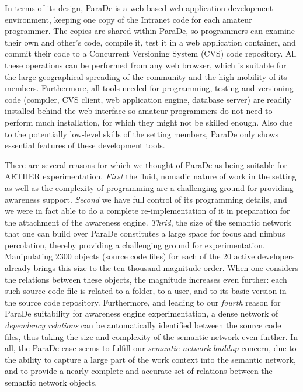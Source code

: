\documentclass{ecscw2007}
\begin{document}
In terms of its design, ParaDe is a web-based web application development environment, keeping one copy of the Intranet code for each amateur programmer. The copies are shared within ParaDe, so programmers can examine their own and other's code, compile it, test it in a web application container, and commit their code to a Concurrent Versioning System (CVS) code repository. All these operations can be performed from any web browser, which is suitable for the large geographical spreading of the community and the high mobility of its members. Furthermore, all tools needed for programming, testing and versioning code (compiler, CVS client, web application engine, database server) are readily installed behind the web interface so amateur programmers do not need to perform much installation, for which they might not be skilled enough. Also due to the potentially low-level skills of the setting members, ParaDe only shows essential features of these development tools.

There are several reasons for which we thought of ParaDe as being suitable for AETHER experimentation. \textit{First} the fluid, nomadic nature of work in the setting as well as the complexity of programming are a challenging ground for providing awareness support. \textit{Second} we have full control of its programming details, and we were in fact able to do a complete re-implementation of it in preparation for the attachment of the awareness engine. \textit{Thrid}, the size of the semantic network that one can build over ParaDe constitutes a large space for focus and nimbus percolation, thereby providing a challenging ground for experimentation. Manipulating 2300 objects (source code files) for each of the 20 active developers already brings this size to the ten thousand magnitude order. When one considers the relations between these objects, the magnitude increases even further: each such source code file is related to a folder, to a user, and to its basic version in the source code repository. Furthermore, and leading to our \textit{fourth} reason for ParaDe suitability for awareness engine experimentation, a dense network of \textit{dependency relations} can be automatically identified between the source code files, thus taking the size and complexity of the semantic network even further. In all, the ParaDe case seems to fulfill our \textit{semantic network buildup} concern, due to the ability to capture a large part of the work context into the semantic network, and to provide a nearly complete and accurate set of relations between the semantic network objects. 
\end{document}
